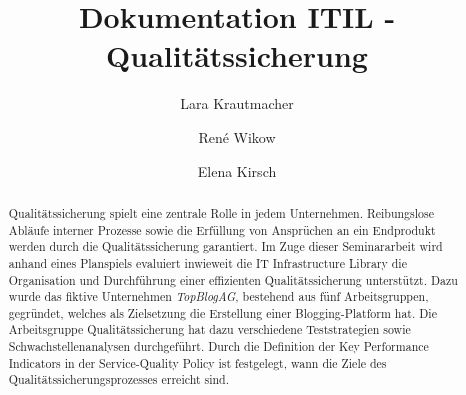 \documentclass[sigconf]{acmart}
\begin{document}
\setlength\emergencystretch{1.5em}

\title{Dokumentation ITIL - Qualitätssicherung}


\author{Lara Krautmacher}
\author{René Wikow}



\author{Elena Kirsch}




\begin{abstract}
Qualitätssicherung spielt eine zentrale Rolle in jedem Unternehmen.
Reibungslose Abläufe interner Prozesse sowie die Erfüllung
von Ansprüchen an ein Endprodukt werden durch die Qualitätssicherung
garantiert. Im Zuge dieser Seminararbeit wird
anhand eines Planspiels evaluiert inwieweit die IT Infrastructure
Library die Organisation und Durchführung einer effizienten Qualitätssicherung
unterstützt. Dazu wurde das fiktive Unternehmen
\textit{TopBlogAG}, bestehend aus fünf Arbeitsgruppen, gegründet, welches
als Zielsetzung die Erstellung einer Blogging-Platform hat. Die
Arbeitsgruppe Qualitätssicherung hat dazu verschiedene Teststrategien
sowie Schwachstellenanalysen durchgeführt. Durch die Definition
der Key Performance Indicators in der Service-Quality Policy
ist festgelegt, wann die Ziele des Qualitätssicherungsprozesses
erreicht sind. 
\end{abstract}
\end{document}
